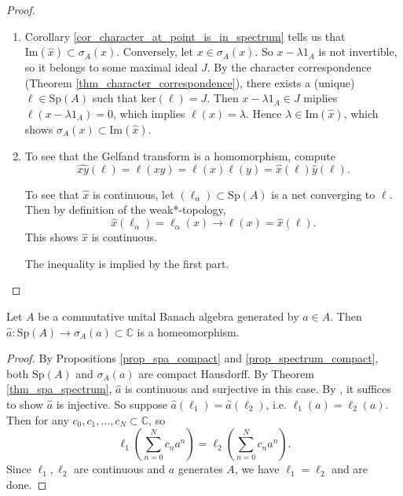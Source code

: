 \documentclass[12pt]{article}
\begin{document}
\begin{proof}
	\hfill
\begin{enumerate}
	\item Corollary \ref{cor_character_at_point_is_in_spectrum} tells us that $\text{Im}(\hat{x}) \subset \sigma_A(x)$. Conversely, let $x\in\sigma_A(x)$. So $x-\lambda 1_A$ is not invertible, so it belongs to some maximal ideal $J$. By the character correspondence (Theorem \ref{thm_character_correspondence}), there exists a (unique) $\ell\in\text{Sp}(A)$ such that $\text{ker}(\ell)=J$. Then $x-\lambda 1_A\in J$ miplies $\ell(x-\lambda 1_A)=0$, which implies $\ell(x)=\lambda$. Hence $\lambda\in\text{Im}(\hat{x})$, which shows $\sigma_A(x)\subset\text{Im}(\hat{x})$. 
	\item To see that the Gelfand transform is a homomorphism, compute
		\begin{equation*}
			\widehat{xy}(\ell) = \ell(xy) = \ell(x)\ell(y) = \hat{x}(\ell)\hat{y}(\ell).
		\end{equation*}
		
		To see that $\hat{x}$ is continuous, let $(\ell_\alpha)\subset\text{Sp}(A)$ is a net converging to $\ell$. Then by definition of the weak*-topology, 
		\begin{equation*}
			\hat{x}(\ell_\alpha) = \ell_\alpha(x) \to \ell(x) = \hat{x}(\ell).
		\end{equation*}
		This shows $\hat{x}$ is continuous.

		The inequality is implied by the first part.
\end{enumerate}
\end{proof}

\begin{corollary}
	Let $A$ be a commutative unital Banach algebra generated by $a\in A$. Then $\hat{a}:\text{Sp}(A)\to\sigma_A(a)\subset\mathbb{C}$ is a homeomorphism.
\end{corollary}
\begin{proof}
	By Propositions \ref{prop_spa_compact} and \ref{prop_spectrum_compact}, both $\text{Sp}(A)$ and $\sigma_A(a)$ are compact Hausdorff. By Theorem \ref{thm_spa_spectrum}, $\hat{a}$ is continuous and surjective in this case. By , it suffices to show $\hat{a}$ is injective. So suppose $\hat{a}(\ell_1) = \hat{a}(\ell_2)$, i.e. $\ell_1(a) = \ell_2(a)$. Then for any $c_0, c_1,\dots, c_N\subset\mathbb{C}$, so 
	\begin{equation*}
		\ell_1\left(\sum_{n=0}^N c_n a^n \right) = \ell_2\left(\sum_{n=0}^N c_n a^n \right).
	\end{equation*}
	Since $\ell_1,\ell_2$ are continuous and $a$ generates $A$, we have $\ell_1=\ell_2$ and are done.
\end{proof}
\end{document}

